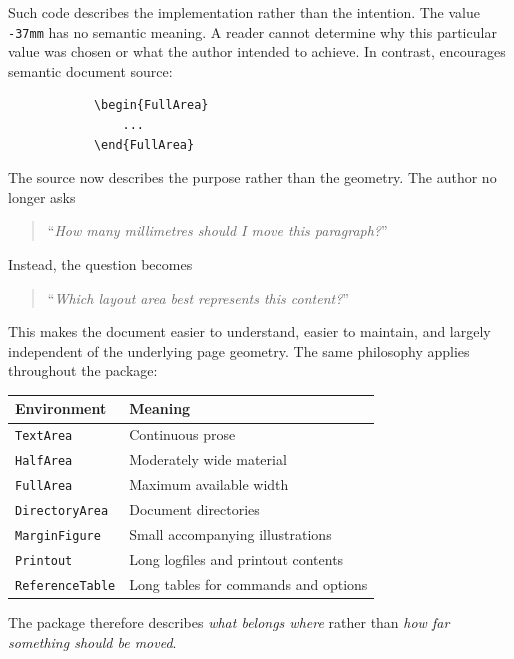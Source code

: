 \documentclass[
11pt,
a4paper,
oneside
]{scrbook}
\begin{document}
\begin{SynchronizedMarginAndTextArea}
	\begin{TextInMarginArea}
		\label{fig:mdlayout-tixi-measuring}
		{}
	\end{TextInMarginArea}
	\begin{TextInTextArea}
		Such code describes the implementation rather than the intention.
		The value \texttt{-37mm} has no semantic meaning.
		A reader cannot determine why this particular value was chosen or what the
		author intended to achieve.
		In contrast, \mdlayout{} encourages semantic document source:
		\begin{verbatim}
			\begin{FullArea}
				...
			\end{FullArea}
		\end{verbatim}
	\end{TextInTextArea}
\end{SynchronizedMarginAndTextArea}
The source now describes the purpose rather than the geometry.
The author no longer asks
\begin{quote}
	``\emph{How many millimetres should I move this paragraph?}''
\end{quote}
Instead, the question becomes
\begin{quote}
	``\emph{Which layout area best represents this content?}''
\end{quote}
This makes the document easier to understand, easier to maintain, and largely
independent of the underlying page geometry.
The same philosophy applies throughout the package:
\begin{center}
	\begin{tabular}{ll}
		\textbf{Environment} & \textbf{Meaning} \\
		\hline
		\texttt{TextArea}      & Continuous prose \\
		\texttt{HalfArea}      & Moderately wide material \\
		\texttt{FullArea}      & Maximum available width \\
		\texttt{DirectoryArea} & Document directories \\
		\texttt{MarginFigure}  & Small accompanying illustrations \\
		\texttt{Printout} 	   & Long logfiles and printout contents \\
		\texttt{ReferenceTable}& Long tables for commands and options \\
	\end{tabular}
\end{center}
The package therefore describes \emph{what belongs where} rather than
\emph{how far something should be moved}.
\end{document}
